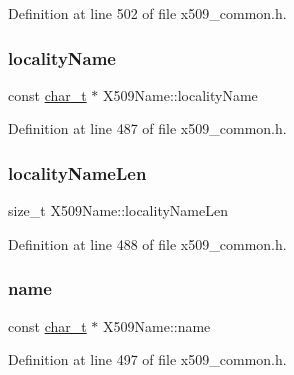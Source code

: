 Definition at line 502 of file x509\+\_\+common.\+h.

\mbox{\label{structX509Name_a9e5c517817abea85a4ad7a8fa074fb76}} 
\subsubsection{\texorpdfstring{locality\+Name}{localityName}}
{\footnotesize\ttfamily const \hyperlink{compiler__port_8h_a40bb5262bf908c328fbcfbe5d29d0201}{char\+\_\+t} $\ast$ X509\+Name\+::locality\+Name}



Definition at line 487 of file x509\+\_\+common.\+h.

\mbox{\label{structX509Name_aba984d3fdf4e5c6eecb90752e54de3a7}} 
\subsubsection{\texorpdfstring{locality\+Name\+Len}{localityNameLen}}
{\footnotesize\ttfamily size\+\_\+t X509\+Name\+::locality\+Name\+Len}



Definition at line 488 of file x509\+\_\+common.\+h.

\mbox{\label{structX509Name_a394c9f9f73684a428aae25966b8ba4ca}} 
\subsubsection{\texorpdfstring{name}{name}}
{\footnotesize\ttfamily const \hyperlink{compiler__port_8h_a40bb5262bf908c328fbcfbe5d29d0201}{char\+\_\+t} $\ast$ X509\+Name\+::name}



Definition at line 497 of file x509\+\_\+common.\+h.

\mbox{\label{structX509Name_a7dbc2e822775eadb3fd3954acdc6f73c}} 
